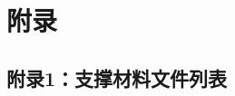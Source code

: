 \documentclass[withoutpreface,bwprint]{cumcmthesis} %
\begin{document}
\renewcommand{\refname}{} 

\nocite{*}












\section{附录}

\subsection*{附录1：支撑材料文件列表}
\end{document}
